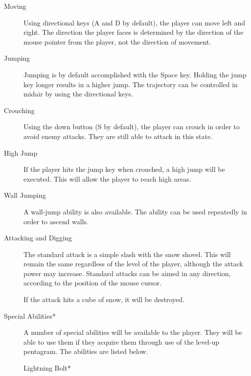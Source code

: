 \documentclass{article}
\begin{document}
\begin{description}

\item[Moving]

Using directional keys (A and D by default), the player can move left and right.  The direction the player faces is determined by the direction of the mouse pointer from the player, not the direction of movement.

\item[Jumping]

Jumping is by default accomplished with the Space key.  Holding the jump key longer results in a higher jump.  The trajectory can be controlled in midair by using the directional keys.

\item[Crouching]

Using the down button (S by default), the player can crouch in order to avoid enemy attacks.  They are still able to attack in this state.

\item[High Jump]

If the player hits the jump key when crouched, a high jump will be executed.  This will allow the player to reach high areas.

\item[Wall Jumping]

A wall-jump ability is also available.  The ability can be used repeatedly in order to ascend walls.

\item[Attacking and Digging]

The standard attack is a simple slash with the snow shovel.  This will remain the same regardless of the level of the player, although the attack power may increase.  Standard attacks can be aimed in any direction, according to the position of the mouse cursor.

If the attack hits a cube of snow, it will be destroyed.

\item[Special Abilities*]

A number of special abilities will be available to the player.  They will be able to use them if they acquire them through use of the level-up pentagram.  The abilities are listed below.

\begin{description}

\item[Lightning Bolt*]


\end{description}
\end{description}
\end{document}
